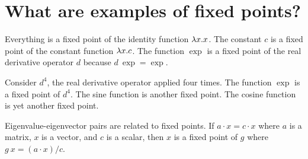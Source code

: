 \section{What are examples of fixed points?}

Everything is a fixed point of the identity function \(\lambda x. x\).
The constant \(c\) is a fixed point of the constant function \(\lambda x. c\).
The function \(\exp\) is a fixed point of the real derivative operator \(d\)
because \(d ~ \exp = \exp\).

Consider \(d^4\), the real derivative operator applied four times.
The function \(\exp\) is a fixed point of \(d^4\).
The sine function is another fixed point.
The cosine function is yet another fixed point.

Eigenvalue-eigenvector pairs are related to fixed points.
If \(a \cdot x = c \cdot x\) where \(a\) is a matrix, \(x\) is a vector, and \(c\) is a scalar,
then \(x\) is a fixed point of \(g\) where \(g~x = (a \cdot x) / c\).
